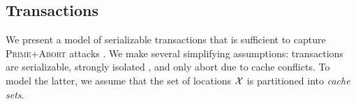 
\subsection{Transactions}
\label{sec:transactions}

We present a model of serializable transactions that is sufficient to capture
\textsc{Prime+Abort} attacks \cite{DBLP:conf/uss/DisselkoenKPT17}.  We make
several simplifying assumptions: transactions are serializable, strongly
isolated \cite{Larus:2007:TM:1207012}, and only abort due to cache conflicts.
To model the latter, we assume that the set of locations $\mathcal{X}$ is
partitioned into \emph{cache sets}.

